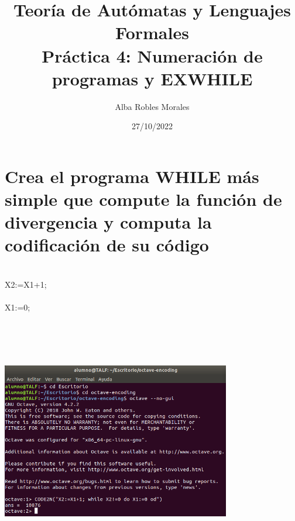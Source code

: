 \documentclass[fleqn, 10pt]{article}
\title{Teoría de Autómatas y Lenguajes Formales\\[.4\baselineskip]Práctica 4: Numeración de programas y EXWHILE}
\author{Alba Robles Morales}
\date{27/10/2022}
\theoremstyle{plain}
\theoremstyle{definition}
\begin{document}
\maketitle

\section{Crea el programa WHILE más simple que compute la función de divergencia y computa la codificación de su código }

\begin{algorithmic}
\\X2:=X1+1;
\\
\\X1:=0;
	
\EndWhile
\\
\\
\begin{center}
\includegraphics[width=10cm, height=8cm]{pr4_ej1_talf.png}
\end{center}

\end{algorithmic}
\end{document}
